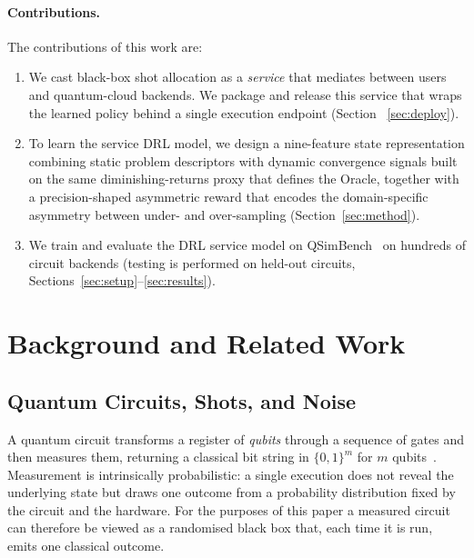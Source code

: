 \documentclass[runningheads]{llncs}
\begin{document}
\paragraph{Contributions.} The contributions of this work are:
\begin{enumerate}
  \item We cast black-box shot allocation as a \emph{service} that mediates
  between users and quantum-cloud backends. We package and release this service that wraps the learned policy behind a single execution
  endpoint (Section ~\ref{sec:deploy}).
  \item  To learn the service DRL model, we design a nine-feature state representation combining static problem
  descriptors with dynamic convergence signals built on the same
  diminishing-returns proxy that defines the Oracle, together
  with a precision-shaped asymmetric reward that encodes the domain-specific
  asymmetry between under- and over-sampling (Section~\ref{sec:method}).
  \item We train and evaluate the DRL service model on QSimBench~\cite{qsimbench} on
  hundreds of circuit backends  (testing is performed on held-out circuits, Sections~\ref{sec:setup}--\ref{sec:results}).
\end{enumerate}

\section{Background and Related Work}
\label{sec:background}

\subsection{Quantum Circuits, Shots, and Noise}
\label{sec:qbackground}

A quantum circuit transforms a register of \emph{qubits} through a sequence of
gates and then measures them, returning a classical bit string in $\{0,1\}^m$
for $m$ qubits~\cite{nielsen2010quantum}. Measurement is intrinsically
probabilistic: a single execution does not reveal the underlying state but draws
one outcome from a probability distribution fixed by the circuit and the
hardware. For the purposes of this paper a measured circuit can therefore be
viewed as a randomised black box that, each time it is run, emits one classical
outcome.
\end{document}
